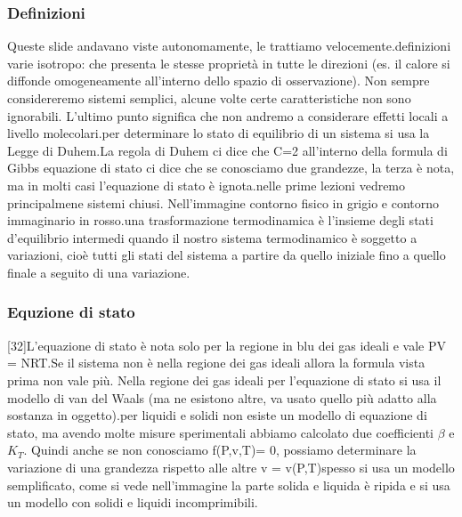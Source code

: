 \subsubsection{Definizioni}
Queste slide andavano viste autonomamente, le trattiamo velocemente.\newline
[19-20] definizioni varie \newline
[21] isotropo: che presenta le stesse proprietà in tutte le direzioni (es. il calore si diffonde omogeneamente all'interno dello spazio di osservazione). Non sempre considereremo sistemi semplici, alcune volte certe caratteristiche non sono ignorabili. L'ultimo punto significa che non andremo a considerare effetti locali a livello molecolari.\newline
[22-23-24] \newline
[25] per determinare lo stato di equilibrio di un sistema si usa la Legge di Duhem.\newline
[26] La regola di Duhem ci dice che C=2 all'interno della formula di Gibbs \newline
[27] equazione di stato ci dice che se conosciamo due grandezze, la terza è nota, ma in molti casi l'equazione di stato è ignota.\newline
[28]\newline
[29] nelle prime lezioni vedremo principalmene sistemi chiusi. Nell'immagine contorno fisico in grigio e contorno immaginario in rosso.\newline
[30] una trasformazione termodinamica è l'insieme degli stati d'equilibrio intermedi quando il nostro sistema termodinamico è soggetto a variazioni, cioè tutti gli stati del sistema a partire da quello iniziale fino a quello finale a seguito di una variazione.\newline
[31]
\subsubsection{Equzione di stato}
[32]\newline
[33-34] L'equazione di stato è nota solo per la regione in blu dei gas ideali e vale PV = NRT.\newline
[35] Se il sistema non è nella regione dei gas ideali allora la formula vista prima non vale più. Nella regione dei gas ideali per l'equazione di stato si usa il modello di van del Waals (ma ne esistono altre, va usato quello più adatto alla sostanza in oggetto).\newline
[36] per liquidi e solidi non esiste un modello di equazione di stato, ma avendo molte misure sperimentali abbiamo calcolato due coefficienti $\beta$ e $K_T$. Quindi anche se non conosciamo f(P,v,T)= 0, possiamo determinare la variazione di una grandezza rispetto alle altre v = v(P,T)\newline
[37] spesso si usa un modello semplificato, come si vede nell'immagine la parte solida e liquida è ripida e si usa un modello con solidi e liquidi incomprimibili.
